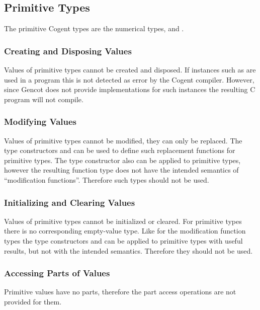\subsection{Primitive Types}
\label{design-operations-prim}

The primitive Cogent types are the numerical types,  and . 

\subsubsection{Creating and Disposing Values}

Values of primitive types cannot be created and disposed. If instances such as  are used in a program 
this is not detected as error by the Cogent compiler. However, since Gencot does not provide implementations for such
instances the resulting C program will not compile.

\subsubsection{Modifying Values}

Values of primitive types cannot be modified, they can only be replaced. The type constructors  and 
can be used to define such replacement functions for primitive types. The type constructor  also
can be applied to primitive types, however the resulting function type does not have the
intended semantics of ``modification functions''. Therefore such types should not be used.

\subsubsection{Initializing and Clearing Values}

Values of primitive types cannot be initialized or cleared. For primitive types there is no corresponding empty-value type.
Like for the modification function types the type constructors
 and  can be applied to primitive types with useful results, but not with the intended semantics.
Therefore they should not be used.

\subsubsection{Accessing Parts of Values}

Primitive values have no parts, therefore the part access operations are not provided for them.

